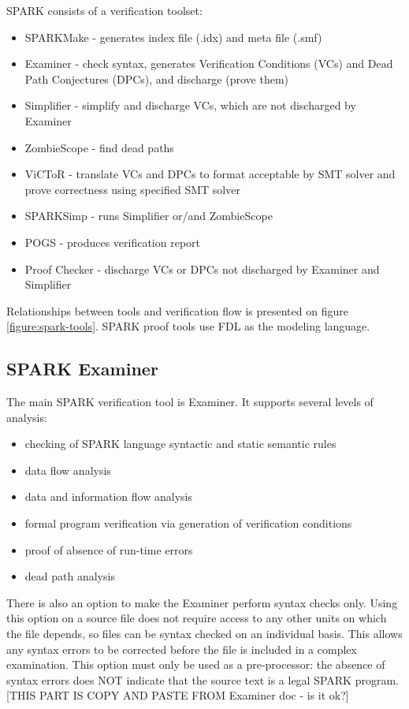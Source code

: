 SPARK consists of a verification toolset:
\begin{itemize}
	\item SPARKMake - generates index file (.idx) and meta file (.smf)
	\item Examiner - check syntax, generates Verification Conditions (VCs) and Dead Path Conjectures (DPCs), and discharge (prove them)
	\item Simplifier - simplify and discharge VCs, which are not discharged by Examiner
	\item ZombieScope - find dead paths
	\item ViCToR - translate VCs and DPCs to format acceptable by SMT solver and prove correctness using specified SMT solver
	\item SPARKSimp - runs Simplifier or/and ZombieScope
	\item POGS - produces verification report
	\item Proof Checker - discharge VCs or DPCs not discharged by Examiner and Simplifier
\end{itemize}

Relationships between tools and verification flow is presented on figure \ref{figure:spark-tools}. SPARK proof tools use FDL as the modeling language. 


\subsection{SPARK Examiner}
\label{verification:examiner}

The main SPARK verification tool is Examiner. It supports several levels of analysis:
\begin{itemize}
	\item checking of SPARK language syntactic and static semantic rules
	\item data flow analysis
	\item data and information flow analysis
	\item formal program verification via generation of verification conditions
	\item proof of absence of run-time errors
	\item dead path analysis
\end{itemize}

There is also an option to make the Examiner perform syntax checks only. Using this option on a source file does not require access to any other units on which the file depends, so files can be syntax checked on an individual basis. This allows any syntax errors to be corrected before the file is included in a complex examination. This option must only be used as a pre-processor: the absence of syntax errors does NOT indicate that the source text is a legal SPARK program. \cite{Examiner:Online} [THIS PART IS COPY AND PASTE FROM Examiner doc - is it ok?]

